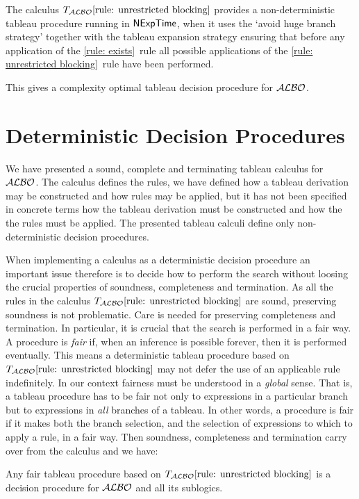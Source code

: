 \documentclass[leqno
,pdflatex
,prodmode
,acmtocl
]{acmsmall}
\newcommand{\mathcmd}[1]{\ensuremath{#1}\xspace}
\newcommand{\dlfont}{\mathcal}
\newcommand{\dl}[1]{\mathcmd{\dlfont{#1}}}
\newcommand{\ALBOid}{\dl{ALBO\smash[t]{\mbox{}}}}
\def\complexityfont{\sffamily\upshape}
\def\complexity#1{\mathcmd{\text{\complexityfont #1}}}
\def\NExpTime{\complexity{NExpTime}}
\newcommand{\TALBOidub}{\mathcmd{T_\ALBOid\eqref{rule: unrestricted blocking}}}
\begin{document}
\begin{theorem}
The calculus \TALBOidub provides a 
non-deterministic tableau procedure running in \NExpTime,
when it uses 
the `avoid huge branch strategy' together with
the tableau expansion strategy ensuring that before
any application of the \eqref{rule: exists}~rule
all possible applications of the \eqref{rule: unrestricted blocking}~rule
have been performed.
\end{theorem}

This gives a complexity optimal tableau decision procedure for
\ALBOid.

\section{Deterministic Decision Procedures}
\label{section_implementation}

We have presented a sound, complete and terminating tableau calculus for \ALBOid.
The calculus defines the rules, we have defined how a tableau
derivation may be constructed and how rules may be applied, but it has
not been specified in concrete terms how the tableau derivation must
be constructed and how the the rules must be applied.
The presented tableau calculi define only non-deterministic decision procedures.

When implementing a calculus as a deterministic
decision procedure an important issue therefore is to decide how to perform the
search without loosing the crucial properties of soundness, completeness
and termination. As all the rules in the calculus \TALBOidub are sound, preserving
soundness is not problematic.
Care is needed for preserving completeness and termination.
In particular, it is crucial that the search is performed in a fair way.
A procedure is \emph{fair} if, when an inference is possible forever,
then it is performed eventually.
This means a deterministic tableau procedure
based on \TALBOidub
may not defer the use of an applicable rule indefinitely.
In our context fairness must be understood in a \emph{global} sense.
That is, a tableau procedure has to be fair not only to expressions in
a particular branch but to expressions in \emph{all} branches of a tableau.
In other words, a procedure is fair if it makes both the branch
selection, and the selection of expressions to which to apply a rule,
in a fair way.
Then soundness, completeness and termination carry over from the
calculus and we have:

\begin{theorem}
Any fair tableau procedure based on \TALBOidub is a decision procedure for
\ALBOid and all its sublogics.
\end{theorem}
\end{document}
